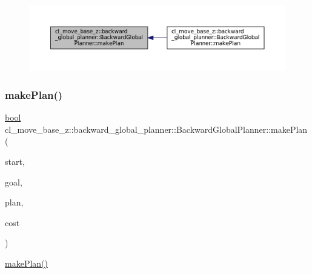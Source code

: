 \begin{figure}[H]
\begin{center}
\leavevmode
\includegraphics[width=350pt]{classcl__move__base__z_1_1backward__global__planner_1_1BackwardGlobalPlanner_a3f1f3c81e7c52c9305544fd793741a41_icgraph}
\end{center}
\end{figure}
\mbox{\label{classcl__move__base__z_1_1backward__global__planner_1_1BackwardGlobalPlanner_a2fe289017031d072f4ac32d017fe989d}} 
\subsubsection{\texorpdfstring{make\+Plan()}{makePlan()}\hspace{0.1cm}{\footnotesize\ttfamily [2/2]}}
{\footnotesize\ttfamily \hyperlink{classbool}{bool} cl\+\_\+move\+\_\+base\+\_\+z\+::backward\+\_\+global\+\_\+planner\+::\+Backward\+Global\+Planner\+::make\+Plan (\begin{DoxyParamCaption}\item[{const geometry\+\_\+msgs\+::\+Pose\+Stamped \&}]{start,  }\item[{const geometry\+\_\+msgs\+::\+Pose\+Stamped \&}]{goal,  }\item[{std\+::vector$<$ geometry\+\_\+msgs\+::\+Pose\+Stamped $>$ \&}]{plan,  }\item[{double \&}]{cost }\end{DoxyParamCaption})}

\hyperlink{classcl__move__base__z_1_1backward__global__planner_1_1BackwardGlobalPlanner_a3f1f3c81e7c52c9305544fd793741a41}{make\+Plan()} 

